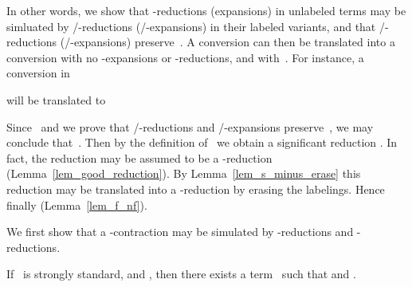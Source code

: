 \documentclass[a4paper,UKenglish]{lipics-v2016}
\begin{document}
In other words, we show that -reductions (expansions) in
unlabeled terms may be simluated by /-reductions
(/-expansions) in their labeled variants, and that
/-reductions (/-expansions) preserve~. A
conversion  can then be translated into a conversion
 with no -expansions or -reductions, and
with~. For instance, a conversion in~

will be translated to

Since~ and we prove that /-reductions and
/-expansions preserve~, we may conclude
that~. Then by the definition of~ we
obtain a significant reduction . In fact, the
reduction may be assumed to be a -reduction
(Lemma~\ref{lem_good_reduction}). By Lemma~\ref{lem_s_minus_erase}
this reduction  may be translated into a
-reduction by erasing the labelings. Hence finally
 (Lemma~\ref{lem_f_nf}).

We first show that a -contraction may be simulated by
-reductions and -reductions.

\begin{lemma}\label{lem_erase_contr}
  If~ is strongly standard,  and
  , then there exists a term~ such that
   and .
\end{lemma}
\end{document}
